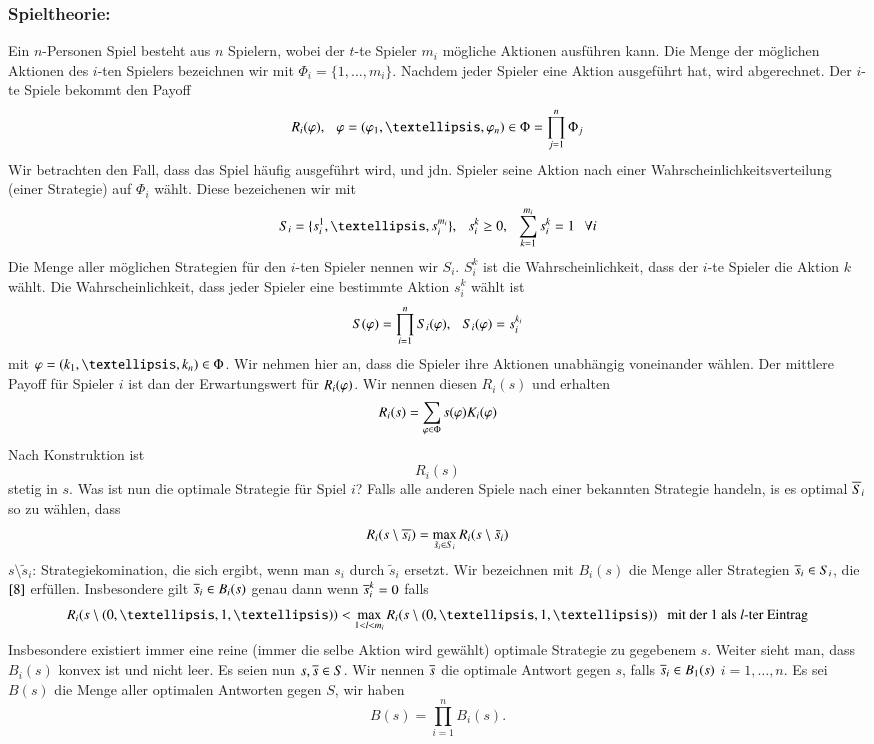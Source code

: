 \subsubsection*{Spieltheorie:}

Ein $n$-Personen Spiel besteht aus $n$ Spielern, wobei der $t$-te Spieler $m_i$ mögliche Aktionen
ausführen kann. Die Menge der möglichen Aktionen des $i$-ten Spielers bezeichnen wir mit
$\Phi_i=\{ 1,…,m_i \}$. Nachdem jeder Spieler eine Aktion ausgeführt hat, wird abgerechnet. Der $i$-te
Spiele bekommt den Payoff
\[
    R_i(\vp), \qq \vp=(\vp_1,…,\vp_n)\in \Phi=\prod_{j=1}^n \Phi_j
\]
Wir betrachten den Fall, dass das Spiel häufig ausgeführt wird, und jdn. Spieler seine Aktion nach einer Wahrscheinlichkeitsverteilung (einer Strategie) auf $\Phi_i $ wählt. Diese bezeichenen wir mit
\[
    S_i=\{s_i^1,…,s_i^{m_i}\},\qq s_i^k\geq 0, \qq \sum_{k=1}^{m_i}s_i^k=1 \qq \forall i
\]
Die Menge aller möglichen Strategien für den $i$-ten Spieler nennen wir $S_i$. $S_i^k$ ist die
Wahrscheinlichkeit, dass der $i$-te Spieler die Aktion $k$ wählt. Die Wahrscheinlichkeit, dass jeder
Spieler eine bestimmte Aktion $s_i^k$ wählt ist
\[
    S(\varphi)=\prod_{i=1}^n S_i(\varphi), \hspace{.25cm} S_i(\varphi)=s_i^{k_i}
\]
mit $\vp=(k_1,…,k_n)\in \Phi$. Wir nehmen hier an, dass die Spieler ihre Aktionen unabhängig voneinander
wählen. Der mittlere Payoff für Spieler $i$ ist dan der Erwartungswert für $R_i(\varphi)$. Wir nennen diesen
$R_i(s)$ und erhalten
\[
    R_i(s)=\sum_{\varphi\in\Phi}s(\varphi) K_i(\varphi)
\]
Nach Konstruktion ist
\[
    R_i(s)
\]
stetig in $s$. Was ist nun die optimale Strategie für Spiel $i$? Falls alle anderen Spiele nach einer
bekannten  Strategie handeln, is es optimal $\overline{S}_i$ so zu wählen, dass
\begin{align}\label{8}
    R_i(s\setminus \overline{s_i})=\max_{\tilde s_i \in S_i} R_i(s\setminus \tilde s_i)
\end{align}
$s\setminus \tilde s_i$: Strategiekomination, die sich ergibt, wenn man $s_i$ durch  $\tilde s_i$
ersetzt. Wir bezeichnen mit $B_i(s)$ die Menge aller Strategien $\overline s_i\in S_i$, die $\ref{8}$ erfüllen.
Insbesondere gilt $\overline s_i\in B_i(s)$ genau dann wenn $\overline s_i^k=0$ falls
\[
    R_i(s\setminus (0,…,1,…)) < \max_{1<l<m_i}R_i(s\setminus(0,…,1,…)) \qq \text{mit der 1 als $l$-ter
    Eintrag}
\]
Insbesondere existiert immer eine reine (immer die selbe Aktion wird gewählt) optimale Strategie
zu gegebenem $s$. Weiter sieht man, dass $B_i(s)$ konvex ist und nicht leer. Es seien nun $s,\overline s\in S$.
Wir nennen $\overline s$ die optimale Antwort gegen $s$, falls $\overline s_i\in B_1(s)$ $i=1,…,n$.
Es sei $B(s)$ die Menge aller optimalen Antworten gegen $S$, wir haben
\[
    B(s)=\prod_{i=1}^n B_i(s).
\]

